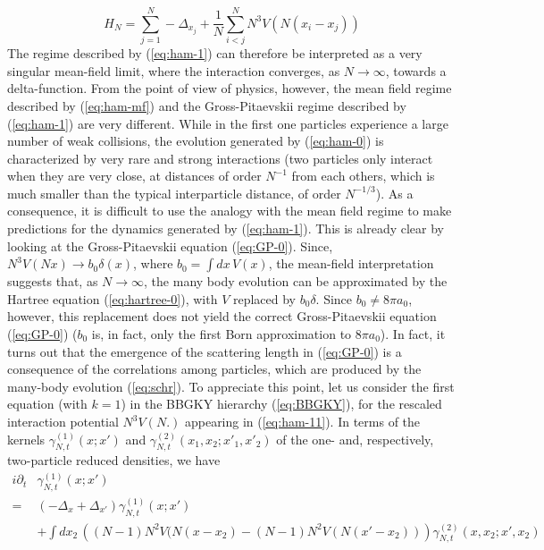 \documentclass[11pt,a4paper]{article}
\begin{document}
\begin{equation}\label{eq:ham-11} H_N = \sum_{j=1}^N -\Delta_{x_j} + \frac{1}{N} \sum_{i<j}^N N^3 V (N (x_i - x_j)) \end{equation}
The regime described by (\ref{eq:ham-1}) can therefore be interpreted as a very singular mean-field limit, where the interaction converges, as $N \to \infty$, towards a delta-function. 
{F}rom the point of view of physics, however, the mean field regime described by (\ref{eq:ham-mf}) and the Gross-Pitaevskii regime described by (\ref{eq:ham-1}) are very different. While in the first one particles experience a large number of weak collisions, the evolution generated by (\ref{eq:ham-0}) is characterized by very rare and strong interactions (two particles only interact when they are very close, at distances of order $N^{-1}$ from each others, which is much smaller than the typical interparticle distance, of order $N^{-1/3}$). As a consequence, it is difficult to use the analogy with the mean field regime to make predictions for the dynamics generated by (\ref{eq:ham-1}). This is already clear by looking at the Gross-Pitaevskii equation (\ref{eq:GP-0}). Since, $N^3 V(Nx) \to b_0 \delta (x)$, where $b_0 = \int dx\, V(x)$, the mean-field interpretation suggests that, as $N \to \infty$, the many body evolution can be approximated by the Hartree equation (\ref{eq:hartree-0}), with $V$ replaced by $b_0 \delta$. Since $b_0 \not = 8 \pi a_0$, however, this replacement does not yield the correct Gross-Pitaevskii equation (\ref{eq:GP-0}) ($b_0$ is, in fact, only the first Born approximation to $8\pi a_0$). In fact, it turns out that the emergence of the scattering length in (\ref{eq:GP-0}) is a consequence of the correlations among particles, which are produced by the many-body evolution  (\ref{eq:schr}). To appreciate this point, let us consider the first equation (with $k=1$) in the BBGKY hierarchy (\ref{eq:BBGKY}), for the rescaled interaction potential $N^3 V (N.)$ appearing in (\ref{eq:ham-11}). In terms of the kernels $\gamma^{(1)}_{N,t} (x;x')$ and $\gamma^{(2)}_{N,t} (x_1, x_2 ; x'_1, x'_2)$ of the one- and, respectively, two-particle reduced densities, we have
\begin{equation}\label{eq:BBGKY1} \begin{split} 
i\partial_t & \gamma^{(1)}_{N,t} (x;x') \\ = \; & \left( -\Delta_x + \Delta_{x'} \right) \gamma^{(1)}_{N,t} (x;x')  
\\ &+ \int dx_2 \, \left( (N-1) N^2 V (N (x-x_2) - (N-1) N^2 V(N (x'-x_2)) \right) \gamma^{(2)}_{N,t} (x,x_2 ; x',x_2) \end{split} \end{equation}
\end{document}
